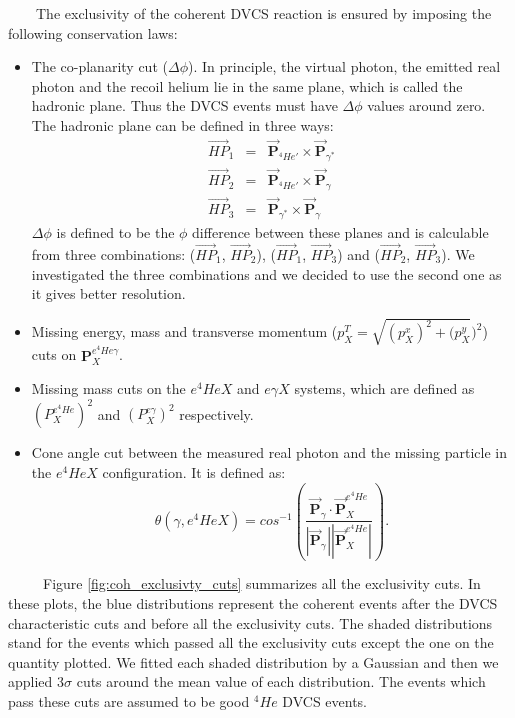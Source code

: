 ~~~~The exclusivity of the coherent DVCS reaction is ensured by imposing the following conservation laws:
\begin{itemize}
\item The co-planarity cut ($\Delta \phi$). In principle, the virtual photon, the emitted real photon and the recoil helium lie in the same plane, which is called the hadronic plane. Thus the DVCS events must have $\Delta \phi$ values around zero. The hadronic plane can be defined in three ways:
\begin{eqnarray}
\overrightarrow{HP}_{1} &=& \overrightarrow{\mathbf{P}}_{^{4}He'} \times 
   \overrightarrow{\mathbf{P}}_{\gamma^{*}}\\
\overrightarrow{HP}_{2} &=& \overrightarrow{\mathbf{P}}_{^{4}He'}  \times 
   \overrightarrow{\mathbf{P}}_{\gamma}\\
\overrightarrow{HP}_{3} &=& \overrightarrow{\mathbf{P}}_{\gamma^{*}} \times 
   \overrightarrow{\mathbf{P}}_{\gamma}
\end{eqnarray}
$\Delta \phi$ is defined to be the $\phi$ difference between these planes and 
is calculable from three combinations: ($\overrightarrow{HP}_{1}$, 
$\overrightarrow{HP}_{2}$), ($\overrightarrow{HP}_{1}$, 
$\overrightarrow{HP}_{3}$) and ($\overrightarrow{HP}_{2}$, 
$\overrightarrow{HP}_{3}$). We investigated the three combinations and we 
decided to use the second one as it gives better resolution.

\item Missing energy, mass and transverse momentum ($p^{T}_{X} = 
   \sqrt{(p^{x}_{X})^2 + (p^{y}_{X}})^2$) cuts on 
   $\mathbf{P}^{e^{4}He\gamma}_{X}$.

\item Missing mass cuts on the $e^{4}HeX$ and $e\gamma X$ systems, which are 
   defined as $(P^{e^{4}He}_{X})^{2}$ and $(P^{e\gamma}_{X})^{2}$ respectively.

\item Cone angle cut between the measured real photon and the missing particle 
   in the $e^{4}HeX$ configuration. It is defined as:
\begin{equation}
\theta(\gamma, e^{4}HeX) = cos^{-1} \left( 
\frac{\overrightarrow{\mathbf{P}}_{\gamma} \cdot 
\overrightarrow{\mathbf{P}}^{e^{4}He}_{X}}{|\overrightarrow{\mathbf{P}}_{\gamma^{}}| 
|\overrightarrow{\mathbf{P}}^{e^{4}He}_{X}|}   \right).
\end{equation}
\end{itemize}
~~~~~Figure \ref{fig:coh_exclusivty_cuts} summarizes all the exclusivity cuts.  
In these plots, the blue distributions represent the coherent events after the 
DVCS characteristic cuts and before all the exclusivity cuts. The shaded 
distributions stand for the events which passed all the exclusivity cuts except 
the one on the quantity plotted. We fitted each shaded distribution by a 
Gaussian and then we applied  3$\sigma$ cuts around the mean value of each 
distribution. The events which pass these cuts are assumed to be good $^{4}He$ 
DVCS events.  ~\\
~\\

